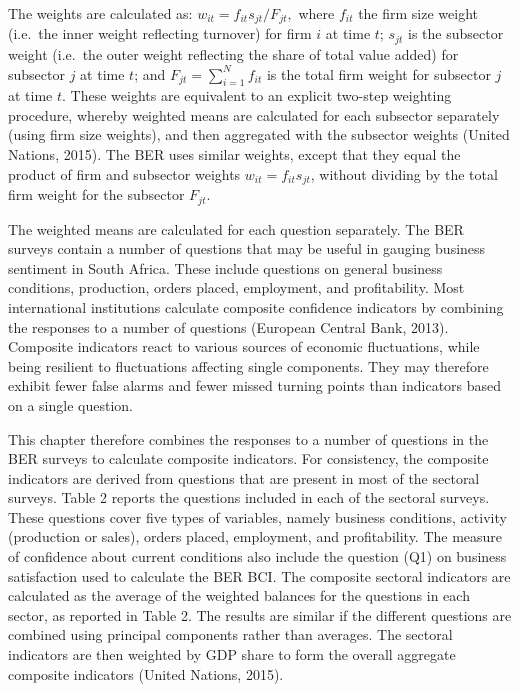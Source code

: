 \documentclass[11pt,]{article}
\begin{document}
The weights are calculated as: \(w_{it} = f_{it} s_{jt} / F_{jt} ,\)
where \(f_{it}\) the firm size weight (i.e.~the inner weight reflecting
turnover) for firm \(i\) at time \(t\); \(s_{jt}\) is the subsector
weight (i.e.~the outer weight reflecting the share of total value added)
for subsector \(j\) at time \(t\); and \(F_{jt} = \sum^N_{i=1} f_{it}\)
is the total firm weight for subsector \(j\) at time \(t\). These
weights are equivalent to an explicit two-step weighting procedure,
whereby weighted means are calculated for each subsector separately
(using firm size weights), and then aggregated with the subsector
weights (United Nations, 2015). The BER uses similar weights, except
that they equal the product of firm and subsector weights
\(w_{it} = f_{it} s_{jt}\), without dividing by the total firm weight
for the subsector \(F_{jt}\).

The weighted means are calculated for each question separately. The BER
surveys contain a number of questions that may be useful in gauging
business sentiment in South Africa. These include questions on general
business conditions, production, orders placed, employment, and
profitability. Most international institutions calculate composite
confidence indicators by combining the responses to a number of
questions (European Central Bank, 2013). Composite indicators react to
various sources of economic fluctuations, while being resilient to
fluctuations affecting single components. They may therefore exhibit
fewer false alarms and fewer missed turning points than indicators based
on a single question.

This chapter therefore combines the responses to a number of questions
in the BER surveys to calculate composite indicators. For consistency,
the composite indicators are derived from questions that are present in
most of the sectoral surveys. Table 2 reports the questions included in
each of the sectoral surveys. These questions cover five types of
variables, namely business conditions, activity (production or sales),
orders placed, employment, and profitability. The measure of confidence
about current conditions also include the question (Q1) on business
satisfaction used to calculate the BER BCI. The composite sectoral
indicators are calculated as the average of the weighted balances for
the questions in each sector, as reported in Table 2. The results are
similar if the different questions are combined using principal
components rather than averages. The sectoral indicators are then
weighted by GDP share to form the overall aggregate composite indicators
(United Nations, 2015).
\end{document}
